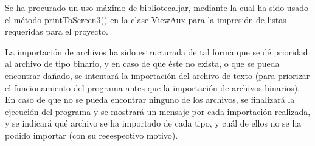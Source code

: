\documentclass[fleqn]{article}
\begin{document}
    Se ha procurado un uso máximo de biblioteca.jar, mediante la cual ha sido usado el método printToScreen3() en la clase ViewAux para la impresión
    de listas requeridas para el proyecto.

    La importación de archivos ha sido estructurada de tal forma que se dé prioridad al archivo de tipo binario, y en caso de que éste no exista, 
    o que se pueda encontrar dañado, se intentará la importación del archivo de texto (para priorizar el funcionamiento del programa antes que la importación
    de archivos binarios). En caso de que no se pueda encontrar ninguno de los archivos, se finalizará la ejecución del programa y se mostrará un mensaje por cada 
    importación realizada, y se indicará qué archivo se ha importado de cada tipo, y cuál de ellos no se ha podido importar (con su reeespectivo motivo).
\end{document}
